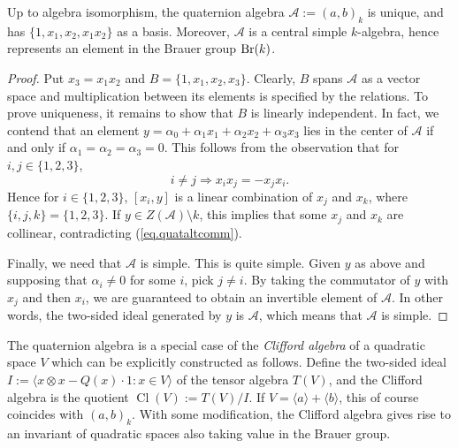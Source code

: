 \documentclass{article}
\newcommand{\qa}[2]{\left(#1\right)_{#2}}
\begin{document}
\begin{proposition}\label{prop.quatalgwelldef}
    Up to algebra isomorphism, the quaternion algebra $\mathcal{A}:=\qa{a,b}{k}$ is unique, and has $\{1,x_1,x_2,x_1x_2\}$ as a basis. Moreover, $\mathcal{A}$ is a central simple $k$-algebra, hence represents an element in the Brauer group $\operatorname{Br}(k)$.
\end{proposition}

\begin{proof}
    Put $x_3=x_1x_2$ and $B=\{1,x_1,x_2,x_3\}$. Clearly, $B$ spans $\mathcal{A}$ as a vector space and multiplication between its elements is specified by the relations. To prove uniqueness, it remains to show that $B$ is linearly independent. In fact, we contend that an element $y=\alpha_0+\alpha_1x_1+\alpha_2x_2+\alpha_3x_3$ lies in the center of $\mathcal{A}$ if and only if $\alpha_1=\alpha_2=\alpha_3=0$. This follows from the observation that for $i,j\in\{1,2,3\}$,
    \begin{equation}\label{eq.quataltcomm}
        i\neq j\Longrightarrow x_ix_j=-x_jx_i.
    \end{equation}
    Hence for $i\in\{1,2,3\}$, $[x_i,y]$ is a linear combination of $x_j$ and $x_k$, where $\{i,j,k\}=\{1,2,3\}$. If $y\in Z(\mathcal{A})\setminus k$, this implies that some $x_j$ and $x_k$ are collinear, contradicting (\ref{eq.quataltcomm}).

    Finally, we need that $\mathcal{A}$ is simple. This is quite simple. Given $y$ as above and supposing that $\alpha_i\neq 0$ for some $i$, pick $j\neq i$. By taking the commutator of $y$ with $x_j$ and then $x_i$, we are guaranteed to obtain an invertible element of $\mathcal{A}$. In other words, the two-sided ideal generated by $y$ is $\mathcal{A}$, which means that $\mathcal{A}$ is simple.
\end{proof}

\begin{remark}
    The quaternion algebra is a special case of the \emph{Clifford algebra} of a quadratic space $V$ which can be explicitly constructed as follows. Define the two-sided ideal $I:=\langle x\otimes x-Q(x)\cdot 1:x\in V\rangle$ of the tensor algebra $T(V)$, and the Clifford algebra is the quotient $\operatorname{Cl}(V):=T(V)/I$. If $V=\langle a\rangle+\langle b\rangle$, this of course coincides with $\qa{a,b}{k}$. With some modification, the Clifford algebra gives rise to an invariant of quadratic spaces also taking value in the Brauer group.
\end{remark}
\end{document}
